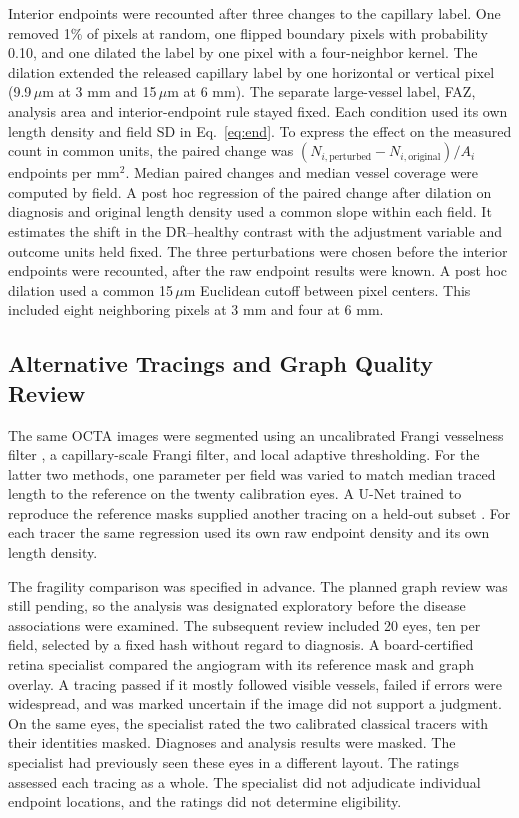 \documentclass[letterpaper]{article}
\begin{document}
Interior endpoints were recounted after three changes to the capillary label. One removed 1\% of pixels at random, one flipped boundary pixels with probability 0.10, and one dilated the label by one pixel with a four-neighbor kernel. The dilation extended the released capillary label by one horizontal or vertical pixel (9.9\,$\mu$m at 3 mm and 15\,$\mu$m at 6 mm). The separate large-vessel label, FAZ, analysis area and interior-endpoint rule stayed fixed. Each condition used its own length density and field SD in Eq.~\ref{eq:end}. To express the effect on the measured count in common units, the paired change was $(N_{i,\mathrm{perturbed}}-N_{i,\mathrm{original}})/A_i$ endpoints per mm$^2$. Median paired changes and median vessel coverage were computed by field. A post hoc regression of the paired change after dilation on diagnosis and original length density used a common slope within each field. It estimates the shift in the DR--healthy contrast with the adjustment variable and outcome units held fixed. The three perturbations were chosen before the interior endpoints were recounted, after the raw endpoint results were known. A post hoc dilation used a common 15\,$\mu$m Euclidean cutoff between pixel centers. This included eight neighboring pixels at 3 mm and four at 6 mm.

\subsection{Alternative Tracings and Graph Quality Review}
The same OCTA images were segmented using an uncalibrated Frangi vesselness filter \citep{frangi1998vesselness}, a capillary-scale Frangi filter, and local adaptive thresholding. For the latter two methods, one parameter per field was varied to match median traced length to the reference on the twenty calibration eyes. A U-Net trained to reproduce the reference masks supplied another tracing on a held-out subset \citep{ronneberger2015unet}. For each tracer the same regression used its own raw endpoint density and its own length density.

The fragility comparison was specified in advance. The planned graph review was still pending, so the analysis was designated exploratory before the disease associations were examined. The subsequent review included 20 eyes, ten per field, selected by a fixed hash without regard to diagnosis. A board-certified retina specialist compared the angiogram with its reference mask and graph overlay. A tracing passed if it mostly followed visible vessels, failed if errors were widespread, and was marked uncertain if the image did not support a judgment. On the same eyes, the specialist rated the two calibrated classical tracers with their identities masked. Diagnoses and analysis results were masked. The specialist had previously seen these eyes in a different layout. The ratings assessed each tracing as a whole. The specialist did not adjudicate individual endpoint locations, and the ratings did not determine eligibility.
\end{document}
